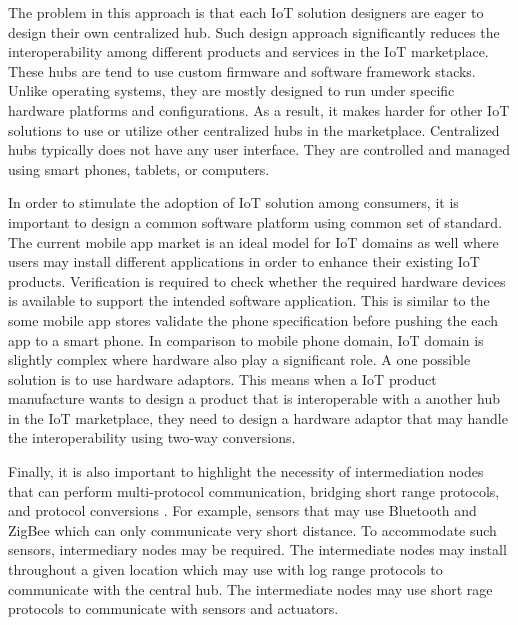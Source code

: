 \documentclass[journal]{IEEEtran}
\begin{document}
The problem in this approach is that each IoT solution designers are eager to design their own centralized hub. Such design approach significantly reduces the interoperability among different products and services in the IoT marketplace. These hubs are tend to use custom firmware and software framework stacks. Unlike operating systems, they are mostly designed to run under specific hardware platforms and configurations. As a result, it makes harder for other IoT solutions to use or utilize other centralized hubs in the marketplace. Centralized hubs typically does not have any user interface. They are controlled and managed using smart phones, tablets, or computers.

In order to stimulate the adoption of IoT solution among consumers, it is important to design a common software platform using common set of standard. The current mobile app market is an ideal model for IoT domains as well where users may install different applications in order to enhance their existing IoT products. Verification is required to check whether the required hardware devices is available to support the intended software application. This is similar to the some mobile app stores validate the phone specification before pushing  the each app to a smart phone.  In comparison to mobile phone domain, IoT domain is slightly complex where  hardware also play a significant role. A one possible solution is to use hardware adaptors. This means when a IoT product manufacture wants to design a product  that is interoperable with a another  hub in the IoT marketplace,  they need to design a hardware adaptor that may handle the interoperability using two-way conversions. 

Finally, it is also important to highlight the necessity of intermediation nodes that can perform multi-protocol communication, bridging short range protocols, and protocol conversions \cite{Z1041}. For example, sensors that may use Bluetooth and ZigBee which can only communicate very short distance. To accommodate such sensors, intermediary nodes may be required.  The intermediate nodes may install throughout a given location which may use with log range protocols to communicate with the central hub.  The intermediate nodes may use short rage protocols to communicate with sensors and actuators.
   
   
\end{document}
